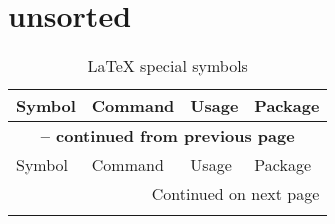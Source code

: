 \section{unsorted}
\begin{longtable}{|l|l|l|l|}
	\caption{\LaTeX{} special symbols} \label{table: latex special symbols} \\
	
	\hline
	Symbol & Command & Usage & Package\\
	\hline
	\endfirsthead
	
	\multicolumn{4}{c}{{\bfseries \tablename{} \thetable{} -- continued from previous page}}\\
	\hline
	Symbol & Command & Usage & Package\\
	\hline
	\endhead
	
	\multicolumn{4}{r}{Continued on next page}\\
	\hline
	\endfoot
	
	\hline \hline
	\endlastfoot
	

\end{longtable}
